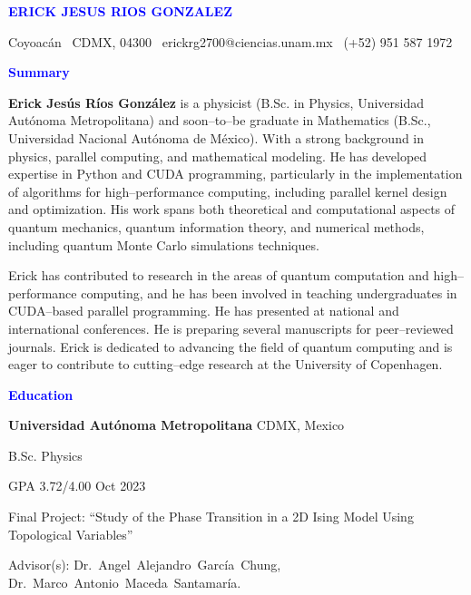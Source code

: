 \documentclass[10pt]{article}
\begin{document}
\begin{center}
    \textbf{\textcolor{blue}{ERICK JESUS RIOS GONZALEZ}}\\ 
    \hrulefill
\end{center}

\begin{center}
    Coyoacán \textbullet \ CDMX, 04300 \textbullet \ erickrg2700@ciencias.unam.mx \textbullet \ (+52) 951 587 1972
\end{center}

\vspace{0.5pt}
\begin{center}
    \textbf{\textcolor{blue}{Summary}}
\end{center}
\vspace{12pt}
\textbf{Erick Jesús Ríos González} is a physicist (B.Sc. in Physics, Universidad Autónoma Metropolitana) and soon–to–be graduate in Mathematics (B.Sc., Universidad Nacional Autónoma de México). With a strong background in physics, parallel computing, and mathematical modeling. He has developed expertise in Python and CUDA programming, particularly in the implementation of algorithms for high–performance computing, including parallel kernel design and optimization. His work spans both theoretical and computational aspects of quantum mechanics, quantum information theory, and numerical methods, including quantum Monte Carlo simulations techniques.

Erick has contributed to research in the areas of quantum computation and high–performance computing, and he has been involved in teaching undergraduates in CUDA–based parallel programming. He has presented at national and international conferences. He is preparing several manuscripts for peer–reviewed journals. Erick is dedicated to advancing the field of quantum computing and is eager to contribute to cutting–edge research at the University of Copenhagen.
\begin{center}
    \textbf{\textcolor{blue}{Education}}
\end{center}
\textbf{Universidad Autónoma Metropolitana} \hfill CDMX, Mexico

B.Sc. Physics

GPA 3.72/4.00 \hfill Oct 2023

Final Project: ``Study of the Phase Transition in a 2D Ising Model Using Topological Variables''

Advisor(s): Dr.\ Angel\ Alejandro\ García\ Chung, Dr.\ Marco\ Antonio\ Maceda\ Santamaría.

\vspace{12pt}
\end{document}
